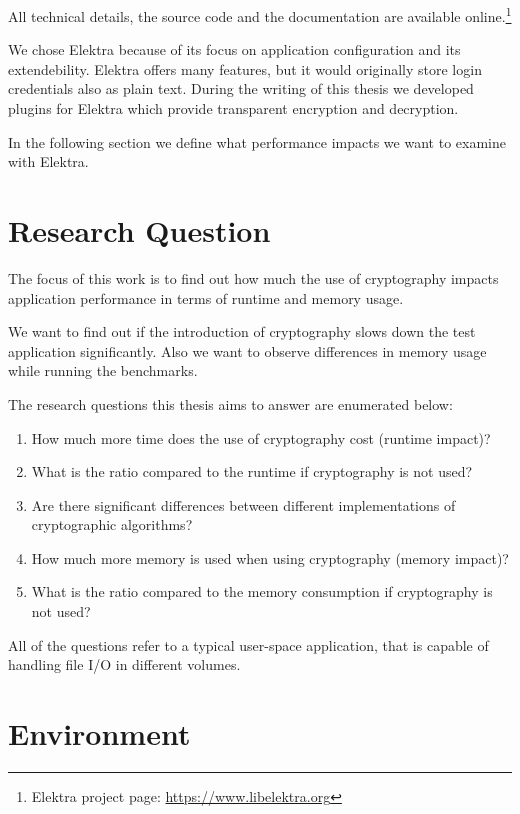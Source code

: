 All technical details, the source code and the documentation are available online.\footnote{Elektra project page: \url{https://www.libelektra.org}}

We chose Elektra because of its focus on application configuration and its extendebility.
Elektra offers many features, but it would originally store login credentials also as plain text.
During the writing of this thesis we developed plugins for Elektra which provide transparent encryption and decryption.

In the following section we define what performance impacts we want to examine with Elektra.

\section{Research Question}

The focus of this work is to find out how much the use of cryptography
impacts application performance in terms of runtime and memory
usage.

We want to find out if the introduction of cryptography slows down the test application significantly.
Also we want to observe differences in memory usage while running the benchmarks.

The research questions this thesis aims to answer are enumerated below:

\begin{enumerate}
\def\labelenumi{\arabic{enumi}.}
\tightlist
\item
  How much more time does the use of cryptography cost (runtime impact)?
\item
  What is the ratio compared to the runtime if cryptography is not used?
\item
  Are there significant differences between different implementations of cryptographic algorithms?
\item
  How much more memory is used when using cryptography (memory impact)?
\item
  What is the ratio compared to the memory consumption if cryptography
  is not used?
\end{enumerate}

All of the questions refer to a typical user-space application, that is capable of handling file I/O in different volumes.

\section{Environment}

